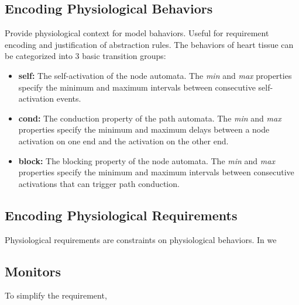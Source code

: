\subsection{Encoding Physiological Behaviors}
Provide physiological context for model bahaviors. Useful for requirement encoding and justification of abstraction rules. The behaviors of heart tissue can be categorized into 3 basic transition groups:

\begin{itemize}
	\item \textbf{self:} The self-activation of the node automata. The \emph{min} and \emph{max} properties specify the minimum and maximum intervals between consecutive self-activation events.
	\item \textbf{cond:} The conduction property of the path automata. The \emph{min} and \emph{max} properties specify the minimum and maximum delays between a node activation on one end and the activation on the other end.
	\item \textbf{block:} The blocking property of the node automata. The \emph{min} and \emph{max} properties specify the minimum and maximum intervals between consecutive activations that can trigger path conduction.
\end{itemize}

\subsection{Encoding Physiological Requirements}
Physiological requirements are constraints on physiological behaviors. In \cite{iccps10} we 

\subsection{Monitors}
To simplify the requirement, \cite{iccps10}
%
